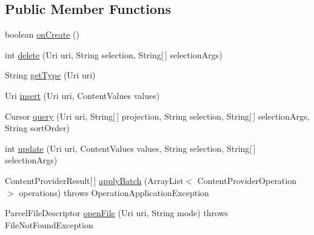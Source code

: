 \subsection*{Public Member Functions}
\begin{DoxyCompactItemize}
\item 
boolean \hyperlink{classuk_1_1ac_1_1swan_1_1digitaltrails_1_1database_1_1_white_rock_content_provider_acd2f75ed715d567cdfd10a85f1d5cde4}{on\+Create} ()
\item 
int \hyperlink{classuk_1_1ac_1_1swan_1_1digitaltrails_1_1database_1_1_white_rock_content_provider_ada4e83c84f3ff3c81306424f411ee717}{delete} (Uri uri, String selection, String\mbox{[}$\,$\mbox{]} selection\+Args)
\item 
String \hyperlink{classuk_1_1ac_1_1swan_1_1digitaltrails_1_1database_1_1_white_rock_content_provider_ac7cd4beaf0b759ae3cf75d053ab8994d}{get\+Type} (Uri uri)
\item 
Uri \hyperlink{classuk_1_1ac_1_1swan_1_1digitaltrails_1_1database_1_1_white_rock_content_provider_abd025abd5279cb2b52f5bdd0aec026cb}{insert} (Uri uri, Content\+Values values)
\item 
Cursor \hyperlink{classuk_1_1ac_1_1swan_1_1digitaltrails_1_1database_1_1_white_rock_content_provider_ae88373574109e457a29ffd6f0bca6be2}{query} (Uri uri, String\mbox{[}$\,$\mbox{]} projection, String selection, String\mbox{[}$\,$\mbox{]} selection\+Args, String sort\+Order)
\item 
int \hyperlink{classuk_1_1ac_1_1swan_1_1digitaltrails_1_1database_1_1_white_rock_content_provider_a27b0a0434512cc107c55c205b244c086}{update} (Uri uri, Content\+Values values, String selection, String\mbox{[}$\,$\mbox{]} selection\+Args)
\item 
Content\+Provider\+Result\mbox{[}$\,$\mbox{]} \hyperlink{classuk_1_1ac_1_1swan_1_1digitaltrails_1_1database_1_1_white_rock_content_provider_ab573bd8caeb367dde2e4c95a6214ae1e}{apply\+Batch} (Array\+List$<$ Content\+Provider\+Operation $>$ operations)  throws Operation\+Application\+Exception 
\item 
Parcel\+File\+Descriptor \hyperlink{classuk_1_1ac_1_1swan_1_1digitaltrails_1_1database_1_1_white_rock_content_provider_aad1175ecf9f106554ff8f7a2f0f5df26}{open\+File} (Uri uri, String mode)  throws File\+Not\+Found\+Exception 
\end{DoxyCompactItemize}
